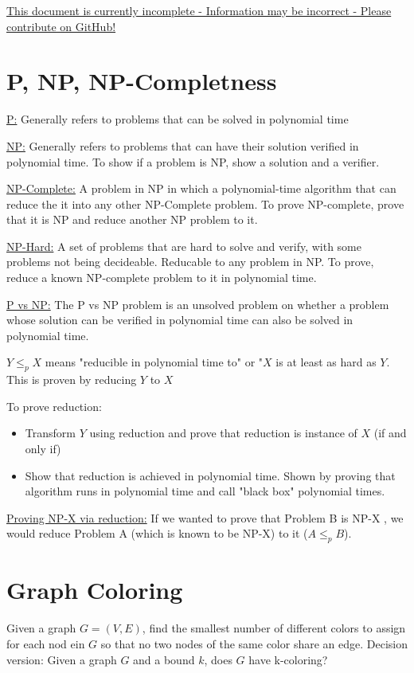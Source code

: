 \documentclass{article}
\begin{document}
\underline{This document is currently incomplete - Information may be incorrect - Please contribute on GitHub!}

\section{P, NP, NP-Completness}

\underline{P:} Generally refers to problems that can be solved in polynomial time

\underline{NP:} Generally refers to problems that can have their solution verified in polynomial time. To show if a problem is NP, show a solution and a verifier.

\underline{NP-Complete:} A problem in NP in which a polynomial-time algorithm that can reduce
the it into any other NP-Complete problem. To prove NP-complete, prove that it is NP and reduce another NP problem to it.

\underline{NP-Hard:} A set of problems that are hard to solve and verify, with some problems not being decideable. Reducable to any problem in NP. To prove, reduce a known NP-complete problem to it in polynomial time.

\underline{P vs NP:} The P vs NP problem is an unsolved problem on whether a problem whose solution can be
verified in polynomial time can also be solved in polynomial time. 

$Y \le_p X$ means "reducible in polynomial time to" or "$X$ is at least as hard as $Y$. This is proven by reducing $Y$ to $X$

To prove reduction:
\begin{itemize}
    \item Transform $Y$ using reduction and prove that reduction is instance of $X$ (if and only if)
    \item Show that reduction is achieved in polynomial time. Shown by proving that algorithm runs in polynomial time and call "black box" polynomial times.
\end{itemize}

\underline{Proving NP-X via reduction:} If we wanted to prove that Problem B is NP-X
, we would reduce Problem A (which is known to be NP-X) to it ($A \leq_p B$). 

\section{Graph Coloring}
Given a graph $G = (V, E)$, find the smallest number of different colors to assign for 
each nod ein $G$ so that no two nodes of the same color share an edge. Decision version: 
Given a graph $G$ and a bound $k$, does $G$ have k-coloring?
\end{document}
